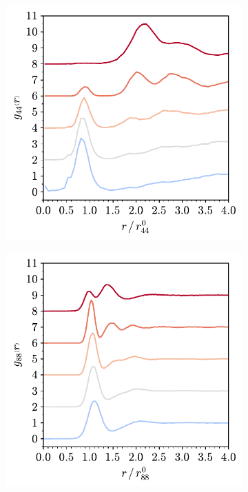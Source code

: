 \begin{figure}[bt]
     \vspace{2mm}
     \begin{subfigure}[b]{0.45\textwidth}
         \centering
         \includegraphics[width=\textwidth]{./figures/targeted_opt/partial_gr_44_zach.pdf}
         \caption{}
         \label{fig:toptrdf3}
     \end{subfigure}
     \hfill
     \begin{subfigure}[b]{0.45\textwidth}
         \centering
         \includegraphics[width=\textwidth]{./figures/targeted_opt/partial_gr_88_zach.pdf}
         \caption{}
         \label{fig:toptrdf4}
     \end{subfigure}
     

\end{figure}
